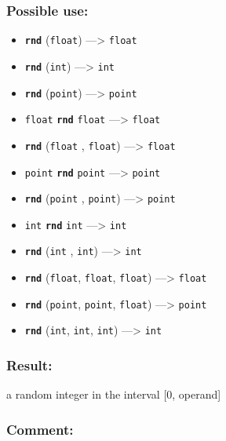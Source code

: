\documentclass[]{book}
\providecommand{\tightlist}{%
  \setlength{\itemsep}{0pt}\setlength{\parskip}{0pt}}
\theoremstyle{definition}
\theoremstyle{definition}
\theoremstyle{definition}
\theoremstyle{remark}
\begin{document}
\subsubsection{Possible use:}\label{possible-use-441}

\begin{itemize}
\tightlist
\item
  \textbf{\texttt{rnd}} (\texttt{float}) ---\textgreater{}
  \texttt{float}
\item
  \textbf{\texttt{rnd}} (\texttt{int}) ---\textgreater{} \texttt{int}
\item
  \textbf{\texttt{rnd}} (\texttt{point}) ---\textgreater{}
  \texttt{point}
\item
  \texttt{float} \textbf{\texttt{rnd}} \texttt{float} ---\textgreater{}
  \texttt{float}
\item
  \textbf{\texttt{rnd}} (\texttt{float} , \texttt{float})
  ---\textgreater{} \texttt{float}
\item
  \texttt{point} \textbf{\texttt{rnd}} \texttt{point} ---\textgreater{}
  \texttt{point}
\item
  \textbf{\texttt{rnd}} (\texttt{point} , \texttt{point})
  ---\textgreater{} \texttt{point}
\item
  \texttt{int} \textbf{\texttt{rnd}} \texttt{int} ---\textgreater{}
  \texttt{int}
\item
  \textbf{\texttt{rnd}} (\texttt{int} , \texttt{int}) ---\textgreater{}
  \texttt{int}
\item
  \textbf{\texttt{rnd}} (\texttt{float}, \texttt{float}, \texttt{float})
  ---\textgreater{} \texttt{float}
\item
  \textbf{\texttt{rnd}} (\texttt{point}, \texttt{point}, \texttt{float})
  ---\textgreater{} \texttt{point}
\item
  \textbf{\texttt{rnd}} (\texttt{int}, \texttt{int}, \texttt{int})
  ---\textgreater{} \texttt{int}
\end{itemize}

\subsubsection{Result:}\label{result-427}

a random integer in the interval {[}0, operand{]}

\subsubsection{Comment:}\label{comment-85}
\end{document}

